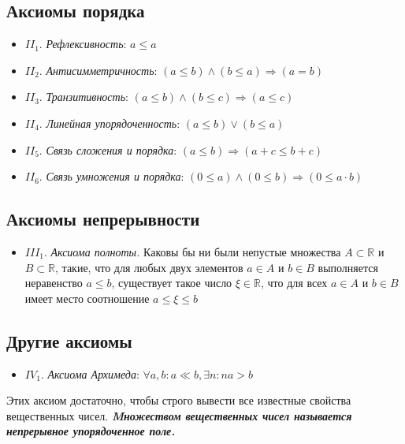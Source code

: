 \subsection{Аксиомы порядка}

\begin{itemize}
    \setlength\itemsep{-0.2em}
    \item $II_1$. \textit{Рефлексивность}: $a\leqslant a$
    \item $II_2$. \textit{Антисимметричность}: $(a\leqslant b)\land (b\leqslant a)\Rightarrow (a=b)$
    \item $II_3$. \textit{Транзитивность}: $(a\leqslant b)\land (b\leqslant c)\Rightarrow (a\leqslant c)$
    \item $II_4$. \textit{Линейная упорядоченность}: $(a\leqslant b)\lor (b\leqslant a)$
    \item $II_5$. \textit{Связь сложения и порядка}: $(a\leqslant b)\Rightarrow (a+c\leqslant b+c)$
    \item $II_6$. \textit{Связь умножения и порядка}: $(0\leqslant a)\land (0\leqslant b)\Rightarrow (0\leqslant a\cdot b)$
\end{itemize}

\subsection{Аксиомы непрерывности}

\begin{itemize}
    \item $III_1$. \textit{Аксиома полноты.} Каковы бы ни были непустые множества $A \subset \mathbb{R}$ и $B \subset \mathbb{R}$, такие, что для любых двух элементов $a \in A$ и $b \in B$ выполняется неравенство $a\leqslant b$, существует такое число $\xi \in \mathbb {R}$, что для всех $a\in A$ и $b\in B$ имеет место соотношение $a\leqslant \xi \leqslant b$
\end{itemize}

\subsection{Другие аксиомы}

\begin{itemize}
    \item $IV_1$. \textit{Аксиома Архимеда}: $\forall a, b : a \ll b, \exists n : na > b$
\end{itemize}

Этих аксиом достаточно, чтобы строго вывести все известные свойства вещественных чисел.
\textit{\textbf{Mножеством вещественных чисел называется непрерывное упорядоченное поле.}}

